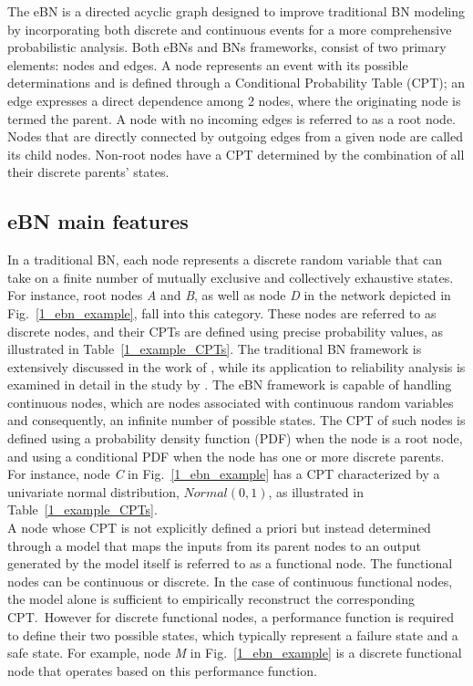 
The eBN is a directed acyclic graph designed to improve traditional BN modeling by incorporating both discrete and continuous events for a more comprehensive probabilistic analysis.
Both eBNs and BNs frameworks, consist of two primary elements: nodes and edges. A node represents an event with its possible determinations and is defined through a Conditional Probability Table (CPT); an edge expresses a direct dependence among 2 nodes, where the originating node is termed the parent.
A node with no incoming edges is referred to as a root node. Nodes that are directly connected by outgoing edges from a given node are called its child nodes.
Non-root nodes have a CPT determined by the combination of all their discrete parents' states.\\

\subsection{eBN main features}
In a traditional BN, each node represents a discrete random variable that can take on a finite number of mutually exclusive and collectively exhaustive states.
For instance, root nodes \textit{A} and  \textit{B}, as well as node \textit{D} in the network depicted in Fig.~\ref{1_ebn_example}, fall into this category.
These nodes are referred to as discrete nodes, and their CPTs are defined using precise probability values, as illustrated in Table~\ref{1_example_CPTs}.
The traditional BN framework is extensively discussed in the work of \textcite{russell_computer}, while its application to reliability analysis is examined in detail in the study by \textcite{langseth_bayesian_2007}.
The eBN framework is capable of handling continuous nodes, which are nodes associated with continuous random variables and consequently, an infinite number of possible states.
The CPT of such nodes is defined using a probability density function (PDF) when the node is a root node, and using a conditional PDF when the node has one or more discrete parents.
For instance, node \textit{C} in Fig.~\ref{1_ebn_example} has a CPT characterized by a univariate normal distribution, $Normal(0,1)$, as illustrated in Table~\ref{1_example_CPTs}. \\  
A node whose CPT is not explicitly defined a priori but instead determined through a model that maps the inputs from its parent nodes to an output generated by the model itself is referred to as a functional node.
The functional nodes can be continuous or discrete. 
In the case of continuous functional nodes, the model alone is sufficient to empirically reconstruct the corresponding CPT.\ 
However for discrete functional nodes, a performance function is required to define their two possible states, which typically represent a failure state and a safe state.
For example, node \textit{M} in Fig.~\ref{1_ebn_example} is a discrete functional node that operates based on this performance function. \\

